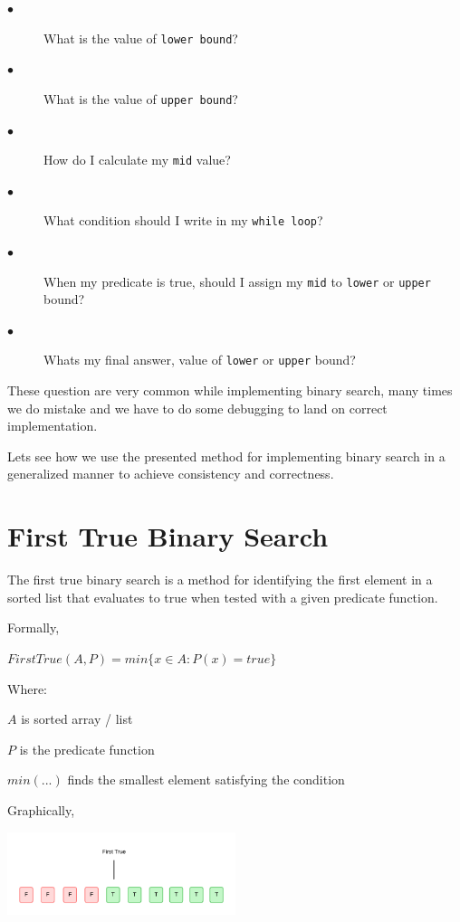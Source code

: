 \documentclass[10pt,twocolumn]{article}
\begin{document}
	\begin{description}
		\item[$\bullet$]  What is the value of \texttt{lower bound}?
		\item[$\bullet$]  What is the value of \texttt{upper bound}?
		\item[$\bullet$]  How do I calculate my \texttt{mid} value?
		\item[$\bullet$]  What condition should I write in my \texttt{while loop}?
		\item[$\bullet$]  When my predicate is true, should I assign my \texttt{mid} to \texttt{lower} or \texttt{upper} bound?
		\item[$\bullet$]  Whats my final answer, value of \texttt{lower} or \texttt{upper} bound?
	\end{description}
	
	These question are very common while implementing binary search, many times we do mistake and we have to do some debugging to land on correct implementation.
	
	Lets see how we use the presented method for implementing binary search in a generalized manner to achieve consistency and correctness.
	
	\section{First True Binary Search}
	
	The first true binary search is a method for identifying the first element in a sorted list that evaluates to true when tested with a given predicate function.	
	
	\vspace{10pt}
	
	Formally, 
	
	\vspace*{5pt}
	$FirstTrue(A, P) = min\{x \in A: P(x) = true\}$
	\vspace*{5pt}
	
	Where:
	
			\quad$A$ is sorted array / list
		
			\quad$P$ is the predicate function
		
			\quad$min(...)$ finds the smallest element satisfying the condition
			
			
		
	\vspace{10pt}
	
	Graphically,
	
	\includegraphics[width=0.5\textwidth]{firsttrue.png}
	
\end{document}
